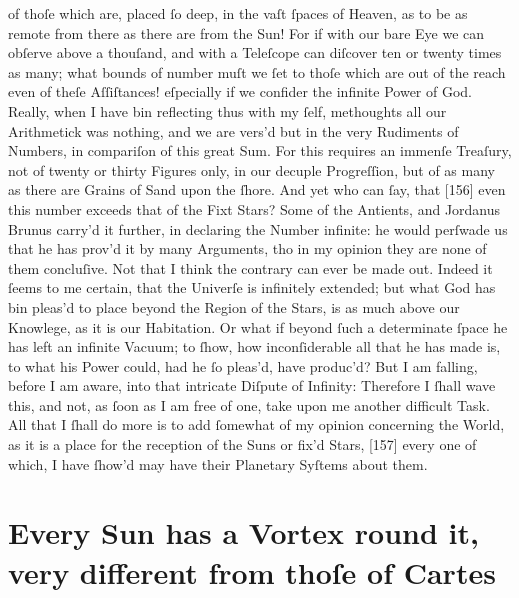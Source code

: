 \documentclass[letterpaper]{book}
\begin{document}
of thoſe which are, placed ſo deep, in the vaſt ſpaces of Heaven, as to be
as remote from there as there are from the Sun! For if with our bare Eye
we can obſerve above a thouſand, and with a Teleſcope can diſcover ten or
twenty times as many; what bounds of number muſt we ſet to thoſe which
are out of the reach even of theſe Aſſiſtances! eſpecially if we confider
the infinite Power of God. Really, when I have bin reflecting thus with my
ſelf, methoughts all our Arithmetick was nothing, and we are vers'd but
in the very Rudiments of Numbers, in compariſon of this great Sum. For
this requires an immenſe Treaſury, not of twenty or thirty Figures only, in
our decuple Progreſſion, but of as many as there are Grains of Sand upon
the ſhore. And yet who can ſay, that [156] even this number exceeds that
of the Fixt Stars? Some of the Antients, and Jordanus Brunus carry'd it
further, in declaring the Number infinite: he would perſwade us that he has
prov'd it by many Arguments, tho in my opinion they are none of them
concluſive. Not that I think the contrary can ever be made out. Indeed it
ſeems to me certain, that the Univerſe is infinitely extended; but what God
has bin pleas'd to place beyond the Region of the Stars, is as much above
our Knowlege, as it is our Habitation.
Or what if beyond ſuch a determinate ſpace he has left an infinite Vacuum; to ſhow, how inconſiderable all that he has made is, to what his Power
could, had he ſo pleas'd, have produc'd? But I am falling, before I am aware,
into that intricate Diſpute of Infinity: Therefore I ſhall wave this, and not,
as ſoon as I am free of one, take upon me another difficult Task. All that I
ſhall do more is to add ſomewhat of my opinion concerning the World, as
it is a place for the reception of the Suns or fix'd Stars, [157] every one of
which, I have ſhow'd may have their Planetary Syſtems about them.


\section{Every Sun has a Vortex round it, very different from thoſe of Cartes}
\end{document}
